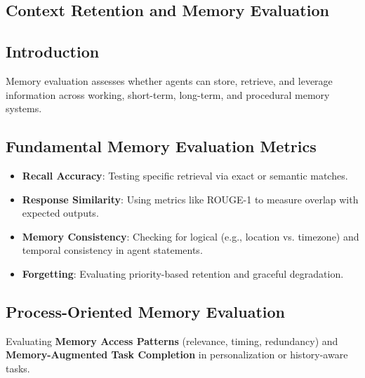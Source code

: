 \begin{TNtwocol}
\section{Context Retention and Memory Evaluation }
\subsection{Introduction}
Memory evaluation assesses whether agents can store, retrieve, and leverage information across working, short-term, long-term, and procedural memory systems.

\subsection{Fundamental Memory Evaluation Metrics}
\begin{itemize}
    \item \textbf{Recall Accuracy}: Testing specific retrieval via exact or semantic matches.
    \item \textbf{Response Similarity}: Using metrics like ROUGE-1 to measure overlap with expected outputs.
    \item \textbf{Memory Consistency}: Checking for logical (e.g., location vs. timezone) and temporal consistency in agent statements.
    \item \textbf{Forgetting}: Evaluating priority-based retention and graceful degradation.
\end{itemize}

\subsection{Process-Oriented Memory Evaluation}
Evaluating \textbf{Memory Access Patterns} (relevance, timing, redundancy) and \textbf{Memory-Augmented Task Completion} in personalization or history-aware tasks.
\end{TNtwocol}
